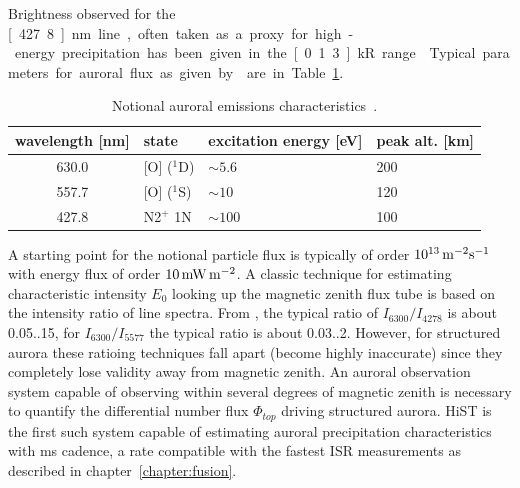 Brightness observed for the \unit[427.8]{nm} line, often taken as a proxy for high-energy precipitation has been given in the \unit[0.1..3]{kR} range \citep{dashkevich2006}.
Typical parameters for auroral flux as given by \citet{sandholtbook} are in Table~\ref{tab:typaurora}.
\begin{table}\centering
	\caption{Notional auroral emissions characteristics~\citep{sandholtbook}.}
    \label{tab:typaurora}
	\begin{tabular}{clll}
        \toprule
		wavelength [nm] & state & excitation energy [eV] & peak alt. [km] \\
		\midrule
		630.0 & [O] ($^1$D) & $\sim5.6$ & 200 \\
		557.7 & [O] ($^1$S) & $\sim10$ & 120 \\
		427.8 & N2$^+$ 1N & $\sim 100$ & 100 \\
        \bottomrule
	\end{tabular}
\end{table}
A starting point for the notional particle flux is typically of order $\unit[10^{13}]{m^{-2}s^{-1}}$ with energy flux of order $\unit[10]{mW \,m^{-2}}$.
A classic technique for estimating characteristic intensity $E_0$ looking up the magnetic zenith flux tube is based on the intensity ratio of line spectra.
From \citet{rees1974}, the typical ratio of $I_{6300}/I_{4278}$ is about 0.05..15, for $I_{6300}/I_{5577}$ the typical ratio is about 0.03..2.
However, for structured aurora these ratioing techniques fall apart (become highly inaccurate) since they completely lose validity away from magnetic zenith. 
An auroral observation system capable of observing within several degrees of magnetic zenith is necessary to quantify the differential number flux $\Phi_{top}$ driving structured aurora.
HiST is the first such system capable of estimating auroral precipitation characteristics with \unit[20]{ms} cadence, a rate compatible with the fastest ISR measurements as described in chapter~\ref{chapter:fusion}.

	
